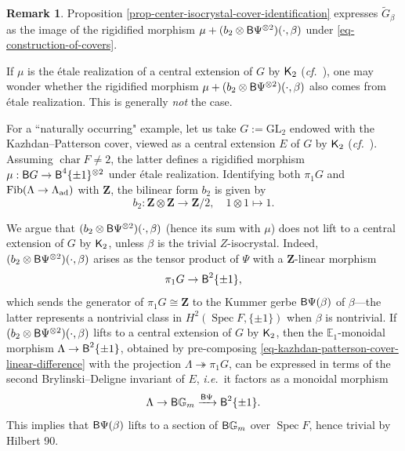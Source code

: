 \documentclass[10pt,english,reqno]{amsart}
\newcommand{\integers}{\mathbf Z}
\newcommand{\characteristic}{\operatorname{char}}
\newcommand{\Fib}{\mathrm{Fib}}
\newcommand{\deloop}{\textnormal{\textsf{B}}}
\newcommand{\Spec}{\operatorname{Spec}}
\newcommand{\adjoint}{\textnormal{ad}}
\newcommand{\GL}{\mathrm{GL}}
\newcommand{\Ktheory}{\textnormal{\textsf{K}}}
\theoremstyle{definition}
\newtheorem{rem}[subsubsection]{Remark}
\numberwithin{equation}{section}
\begin{document}
\begin{rem}
\label{rem-kazhdan-patterson-linear-difference}
Proposition \ref{prop-center-isocrystal-cover-identification} expresses $\widetilde G_{\beta}$ as the image of the rigidified morphism $\mu + (b_2\otimes \deloop\Psi^{\otimes 2})(\cdot, \beta)$ under \eqref{eq-construction-of-covers}.

If $\mu$ is the \'etale realization of a central extension of $G$ by $\Ktheory_2$ (\emph{cf.}~\cite[\S2.3]{zhao2022metaplectic}), one may wonder whether the rigidified morphism $\mu + (b_2 \otimes \deloop\Psi^{\otimes 2})(\cdot, \beta)$ also comes from \'etale realization. This is generally \emph{not} the case.

For a ``naturally occurring" example, let us take $G := \GL_2$ endowed with the Kazhdan--Patterson cover, viewed as a central extension $E$ of $G$ by $\Ktheory_2$ (\emph{cf.}~\cite[\S13.2]{MR3802419}). Assuming $\characteristic F \neq 2$, the latter defines a rigidified morphism $\mu : \deloop G \rightarrow \deloop^4\{\pm 1\}^{\otimes 2}$ under \'etale realization. Identifying both $\pi_1 G$ and $\Fib(\Lambda \rightarrow \Lambda_{\adjoint})$ with $\integers$, the bilinear form $b_2$ is given by
$$
b_2 : \integers \otimes \integers \rightarrow \integers/2,\quad 1\otimes 1\mapsto 1.
$$

We argue that $(b_2\otimes \deloop\Psi^{\otimes 2})(\cdot, \beta)$ (hence its sum with $\mu$) does not lift to a central extension of $G$ by $\Ktheory_2$, unless $\beta$ is the trivial $Z$-isocrystal. Indeed, $(b_2\otimes \deloop\Psi^{\otimes 2})(\cdot, \beta)$ arises as the tensor product of $\Psi$ with a $\integers$-linear morphism
\begin{equation}
\label{eq-kazhdan-patterson-cover-linear-difference}
\pi_1 G \rightarrow \deloop^2\{\pm 1\},
\end{equation}
which sends the generator of $\pi_1 G\cong \integers$ to the Kummer gerbe $\deloop\Psi(\beta)$ of $\beta$---the latter represents a nontrivial class in $H^2(\Spec F, \{\pm 1\})$ when $\beta$ is nontrivial. If $(b_2\otimes\deloop\Psi^{\otimes 2})(\cdot, \beta)$ lifts to a central extension of $G$ by $\Ktheory_2$, then the $\mathbb E_1$-monoidal morphism $\Lambda \rightarrow \deloop^2\{\pm 1\}$, obtained by pre-composing \eqref{eq-kazhdan-patterson-cover-linear-difference} with the projection $\Lambda\twoheadrightarrow \pi_1 G$, can be expressed in terms of the second Brylinski--Deligne invariant of $E$, \emph{i.e.}~it factors as a monoidal morphism
$$
\Lambda \rightarrow \deloop \mathbb G_m \xrightarrow{\deloop\Psi} \deloop^2\{\pm 1\}.
$$
This implies that $\deloop\Psi(\beta)$ lifts to a section of $\deloop \mathbb G_m$ over $\Spec F$, hence trivial by Hilbert 90.
\end{rem}




\end{document}
